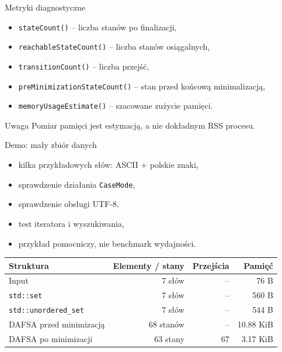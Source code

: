 \documentclass{beamer}
\begin{document}
\begin{frame}{Metryki diagnostyczne}
    \begin{itemize}
        \item \texttt{stateCount()} -- liczba stanów po finalizacji,
        \item \texttt{reachableStateCount()} -- liczba stanów osiągalnych,
        \item \texttt{transitionCount()} -- liczba przejść,
        \item \texttt{preMinimizationStateCount()} -- stan przed końcową minimalizacją,
        \item \texttt{memoryUsageEstimate()} -- szacowane zużycie pamięci.
    \end{itemize}

    \begin{block}{Uwaga}
        Pomiar pamięci jest estymacją, a nie dokładnym RSS procesu.
    \end{block}
\end{frame}

\begin{frame}{Demo: mały zbiór danych}
    \begin{itemize}
        \item kilka przykładowych słów: ASCII + polskie znaki,
        \item sprawdzenie działania \texttt{CaseMode},
        \item sprawdzenie obsługi UTF-8,
        \item test iteratora i wyszukiwania,
        \item przykład pomocniczy, nie benchmark wydajności.
    \end{itemize}

    \begin{table}
        \centering
        \small
        \begin{tabular}{lrrr}
            \hline
            Struktura                    & Elementy / stany & Przejścia & Pamięć    \\
            \hline
            Input                        & 7 słów           & --        & 76 B      \\
            \texttt{std::set}            & 7 słów           & --        & 560 B     \\
            \texttt{std::unordered\_set} & 7 słów           & --        & 544 B     \\
            DAFSA przed minimizacją      & 68 stanów        & --        & 10.88 KiB \\
            DAFSA po minimizacji         & 63 stany         & 67        & 3.17 KiB  \\
            \hline
        \end{tabular}
    \end{table}
\end{frame}
\end{document}
